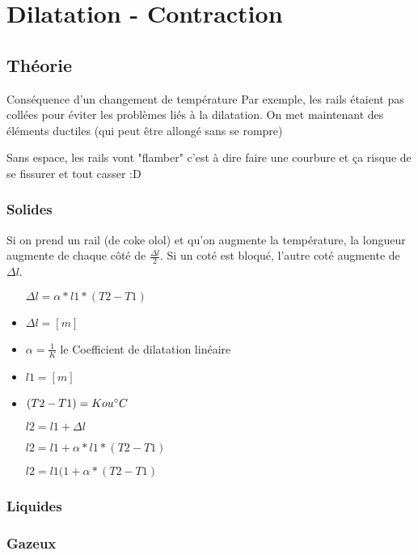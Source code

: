 
\chapter{Dilatation - Contraction}
\section{Théorie}
Conséquence d'un changement de température
Par exemple, les rails étaient pas collées pour éviter les problèmes liés à la dilatation. On met maintenant des éléments ductiles (qui peut être allongé sans se rompre)

Sans espace, les rails vont "flamber" c'est à dire faire une courbure et ça risque de se fissurer et tout casser :D

\subsection{Solides}
Si on prend un rail (de coke olol) et qu'on augmente la température, la longueur augmente de chaque côté de $\frac{{\Delta}l}{2}$. Si un coté est bloqué, l'autre coté augmente de  ${\Delta}l$.

\begin{itemize}
    \item[${\Delta}l = \alpha * l1 * (T2 - T1)$]
    \item ${\Delta}l = [m]$
    \item $\alpha = \frac{1}{K}$ le Coefficient de dilatation linéaire
    \item $l1 = [m]$
    \item $(T2 - T1) = K ou \celsius$
    \item[$l2 = l1 + {\Delta}l$]
    \item[$l2 = l1 + \alpha * l1 * (T2 - T1)$]
    \item[$l2 = l1 (1+\alpha*(T2-T1)$]
\end{itemize}


\subsection{Liquides}
\subsection{Gazeux}
